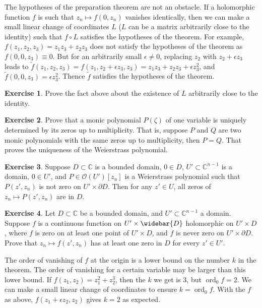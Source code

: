 \documentclass[12pt,openany]{book}
\newcommand{\ord}{\operatorname{ord}}
\newcommand{\C}{{\mathbb{C}}}
\newcommand{\sO}{{\mathscr{O}}}
\theoremstyle{plain}
\theoremstyle{remark}
\theoremstyle{definition}
\newenvironment{exbox}{%
    \def\FrameCommand{\vrule width 1pt \relax\hspace{10pt}}%
    \MakeFramed{\advance\hsize-\width\FrameRestore}%
}{%
    \endMakeFramed
}
\theoremstyle{exercise}
\newtheorem{exercise}{Exercise}[section]
\theoremstyle{example}
\begin{document}
The hypotheses of the preparation theorem are not an obstacle.  If a holomorphic
function $f$ is such that $z_n \mapsto f(0,z_n)$ vanishes identically,
then we can make a small linear change of
coordinates $L$ ($L$ can be a matrix arbitrarily close to the identity) such
that $f \circ L$ satisfies the hypotheses of the theorem.
For example, $f(z_1,z_2,z_3) = z_1z_3+z_2z_3$ does not satisfy the
hypotheses of the theorem as $f(0,0,z_3) \equiv 0$.  But for an arbitrarily
small $\epsilon \not= 0$, replacing
$z_2$ with $z_2 + \epsilon z_3$ leads to $\tilde{f}(z_1,z_2,z_3)
= f(z_1,z_2+\epsilon z_3,z_3) = 
z_1z_3+z_2z_3 + \epsilon z_3^2$, and $\tilde{f}(0,0,z_3) = \epsilon z_3^2$.
Thence $\tilde{f}$
satisfies the hypotheses of the theorem.

\begin{exbox}
\begin{exercise}
Prove the fact above about the existence of $L$ arbitrarily close to the
identity.
\end{exercise}

\begin{exercise}
Prove that a monic polynomial $P(\zeta)$ of one variable is
uniquely determined by its zeros up to multiplicity.  That is, suppose
$P$ and $Q$ are two monic polynomials with the same zeros
up to multiplicity,
then $P=Q$.  That proves the uniqueness of the Weierstrass polynomial.
\end{exercise}

\begin{exercise}
Suppose $D \subset \C$ is a bounded domain, $0 \in D$,
$U' \subset \C^{n-1}$ is a domain, $0 \in U'$,
and $P \in \sO(U')[z_n]$ is a Weierstrass polynomial
such that $P(z',z_n)$ is not zero on $U' \times \partial D$.
Then for any $z' \in U$, all zeros of $z_n \mapsto P(z',z_n)$ are in $D$.
\end{exercise}

\begin{exercise}
Let $D \subset \C$ be a bounded domain,
and
$U' \subset \C^{n-1}$ a domain.
Suppose
$f$ is a continuous function on
$U' \times \widebar{D}$ holomorphic on $U' \times D$,
where $f$ is zero on at least one point
of $U' \times D$, and $f$ is never zero on
$U' \times \partial D$.
Prove that
$z_n \mapsto f(z',z_n)$ has at least one zero in $D$ for every $z' \in U'$.
\end{exercise}
\end{exbox}

\pagebreak[2]
The order of vanishing of $f$ at the origin is a lower bound
on the number $k$ in the theorem.  The order of vanishing for a certain
variable may be larger than this lower bound.  If $f(z_1,z_2) =
z_1^2 + z_2^3$, then the $k$ we get is 3, but $\ord_0 f = 2$.
We can make a small
linear change of coordinates to ensure $k = \ord_0 f$.
With the $f$ as above, $f(z_1 + \epsilon z_2,z_2)$ gives $k = 2$
as expected.
\end{document}

